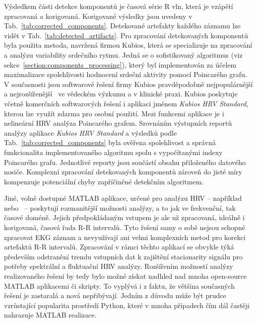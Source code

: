 Výsledkem části detekce komponentů je časová série R vln, která je vzápětí
zpracovaná a korigovaná. Korigované výsledky jsou uvedeny v
Tab.~\ref{tab:corrected_components}. Detekované artefakty každého záznamu lze
vidět v Tab.~\ref{tab:detected_artifacts}. Pro zpracování detekovaných
komponentů byla použita metoda, navržená firmou Kubios, která se specializuje na
zpracování a analýzu variability srdečního rytmu. Jedná se o sofistikovaný
algoritmus (viz sekce~\ref{section:components_processing}), který byl
implementován za účelem maximalizace spolehlivosti hodnocení srdeční aktivity
pomocí Poincarého grafu. V současnosti jsou softwarové řešení firmy Kubios
pravděpodobně nejpopulárnější a nejrozšířenější~\cite{Cilhoroz2020} ve vědeckém výzkumu a v
klinické praxi. Kubios poskytuje včetně komerčních softwarových řešení i
aplikaci jménem \textit{Kubios HRV Standard}, kterou lze využít zdarma pro
osobní použití. Mezi funkcemi aplikace je i nelineární HRV analýza Poincarého
grafem. Srovnáním výstupních reportů analýzy aplikace \textit{Kubios HRV
Standard} a výsledků podle Tab.~\ref{tab:corrected_components} byla ověřena
spolehlivost a správná funkcionalita implementovaného algoritmu spolu s vypočítanými
indexy Poincarého grafu. Jednotlivé reporty jsou součástí obsahu přiloženého
datového nosiče. Komplexní zpracování detekovaných komponentů zároveň do jisté
míry kompenzuje potenciální chyby zapříčiněné detekčním algoritmem.

Jiné, volně dostupné MATLAB aplikace, určené pro analýzu HRV --
například~\cite{Ramshur2010} nebo~\cite{Kardia2010} -- poskytují rozmanitější
možnosti analýzy, a to jak ve frekvenční, tak časové doméně. Jejich
předpokládaným vstupem je ale už zpracovaná, ideálně i korigovaná, časová řada
R-R intervalů. Tyto řešení samy o sobě nejsou schopné zpracovat EKG záznam a
nevyužívají ani velmi komplexních metod pro korekci artefaktů R-R intervalů.
Zpracování v rámci těchto aplikací se obvykle týká především odstranění trendu
vstupních dat k zajištění stacionarity signálu pro potřeby spektrální a
fluktuační HRV analýzy. Rozšířením možností analýzy realizovaného řešení by tedy
bylo možné získat nadhled nad mnoha open-source MATLAB aplikacemi či skripty. To
vyplývá i z faktu, že většina současných řešení je zastaralá a nová nepřibývají.
Jedním z důvodu může být prudce vzrůstající popularita prostředí Python, které v
mnoha případech čím dál častěji nahrazuje MATLAB realizace.

